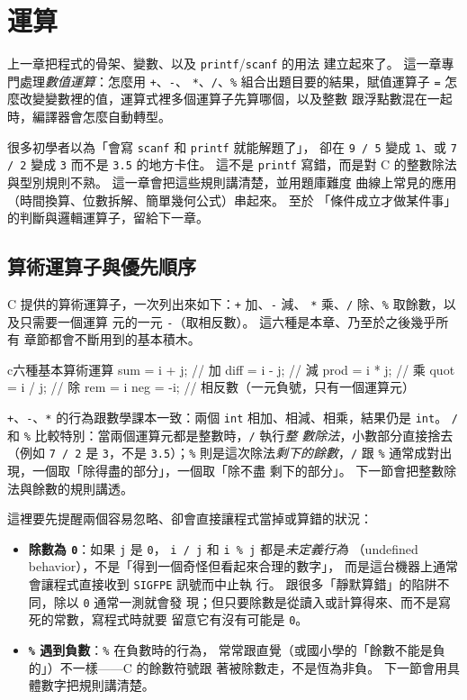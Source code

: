 \chapter{運算}
\label{ch:arithmetic}

上一章把程式的骨架、變數、以及 \texttt{printf}/\texttt{scanf} 的用法
建立起來了。 這一章專門處理\emph{數值運算}：怎麼用 \texttt{+}、\texttt{-}、
\texttt{*}、\texttt{/}、\texttt{\%} 組合出題目要的結果，賦值運算子
\texttt{=} 怎麼改變變數裡的值，運算式裡多個運算子先算哪個，以及整數
跟浮點數混在一起時，編譯器會怎麼自動轉型。

很多初學者以為「會寫 \texttt{scanf} 和 \texttt{printf} 就能解題了」，
卻在 \texttt{9 / 5} 變成 \texttt{1}、或 \texttt{7 / 2} 變成 \texttt{3}
而不是 \texttt{3.5} 的地方卡住。 這不是 \texttt{printf} 寫錯，而是對
C 的整數除法與型別規則不熟。 這一章會把這些規則講清楚，並用題庫難度
曲線上常見的應用（時間換算、位數拆解、簡單幾何公式）串起來。 至於
「條件成立才做某件事」的判斷與邏輯運算子，留給下一章。

\section{算術運算子與優先順序}
\label{sec:arith-operators}

C 提供的算術運算子，一次列出來如下：\texttt{+} 加、\texttt{-} 減、
\texttt{*} 乘、\texttt{/} 除、\texttt{\%} 取餘數，以及只需要一個運算
元的一元 \texttt{-}（取相反數）。 這六種是本章、乃至於之後幾乎所有
章節都會不斷用到的基本積木。

\begin{code}{c}{六種基本算術運算}
sum  = i + j;   // 加
diff = i - j;   // 減
prod = i * j;   // 乘
quot = i / j;   // 除
rem  = i %
neg  = -i;      // 相反數（一元負號，只有一個運算元）
\end{code}

\texttt{+}、\texttt{-}、\texttt{*} 的行為跟數學課本一致：兩個
\texttt{int} 相加、相減、相乘，結果仍是 \texttt{int}。 \texttt{/} 和
\texttt{\%} 比較特別：當兩個運算元都是整數時，\texttt{/} 執行\emph{整
數除法}，小數部分直接捨去（例如 \texttt{7 / 2} 是 \texttt{3}，不是
\texttt{3.5}）；\texttt{\%} 則是這次除法\emph{剩下的餘數}，\texttt{/}
跟 \texttt{\%} 通常成對出現，一個取「除得盡的部分」，一個取「除不盡
剩下的部分」。 下一節會把整數除法與餘數的規則講透。

這裡要先提醒兩個容易忽略、卻會直接讓程式當掉或算錯的狀況：

\begin{itemize}
  \item \textbf{除數為 \texttt{0}}：如果 \texttt{j} 是 \texttt{0}，
  \texttt{i / j} 和 \texttt{i \% j} 都是\emph{未定義行為}
  （undefined behavior），不是「得到一個奇怪但看起來合理的數字」，
  而是這台機器上通常會讓程式直接收到 \texttt{SIGFPE} 訊號而中止執
  行。 跟很多「靜默算錯」的陷阱不同，除以 \texttt{0} 通常一測就會發
  現；但只要除數是從讀入或計算得來、而不是寫死的常數，寫程式時就要
  留意它有沒有可能是 \texttt{0}。
  \item \textbf{\texttt{\%} 遇到負數}：\texttt{\%} 在負數時的行為，
  常常跟直覺（或國小學的「餘數不能是負的」）不一樣——C 的餘數符號跟
  著被除數走，不是恆為非負。 下一節會用具體數字把規則講清楚。
\end{itemize}


